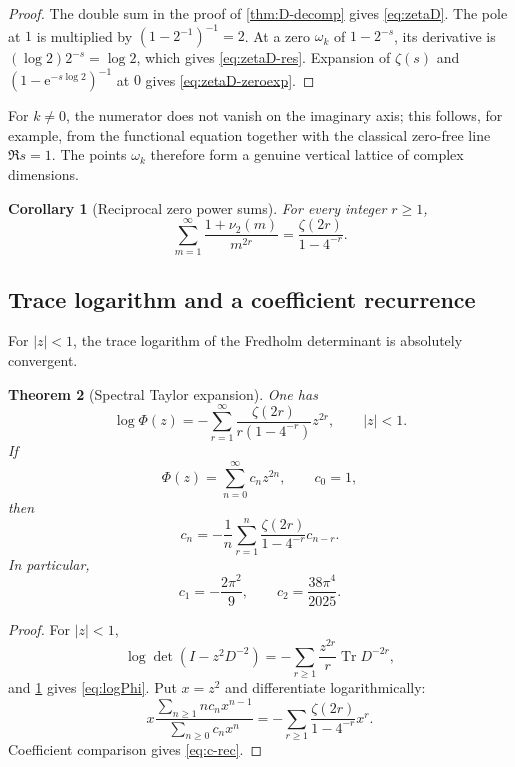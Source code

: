 \documentclass[11pt,oneside]{article}
\numberwithin{equation}{section}
\theoremstyle{plain}
\newtheorem{theorem}{Theorem}[section]
\newtheorem{corollary}[theorem]{Corollary}
\theoremstyle{definition}
\theoremstyle{remark}
\newcommand{\Tr}{\operatorname{Tr}}
\newcommand{\e}{\mathrm e}
\begin{document}
\begin{proof}
The double sum in the proof of \cref{thm:D-decomp} gives \cref{eq:zetaD}.  The pole at $1$ is multiplied by $(1-2^{-1})^{-1}=2$.  At a zero $\omega_k$ of $1-2^{-s}$, its derivative is $(\log2)2^{-s}=\log2$, which gives \cref{eq:zetaD-res}.  Expansion of $\zeta(s)$ and $(1-\e^{-s\log2})^{-1}$ at $0$ gives \cref{eq:zetaD-zeroexp}.
\end{proof}

For $k\ne0$, the numerator does not vanish on the imaginary axis; this follows, for example, from the functional equation together with the classical zero-free line $\Re s=1$.  The points $\omega_k$ therefore form a genuine vertical lattice of complex dimensions.

\begin{corollary}[Reciprocal zero power sums]\label{cor:zero-powers}
For every integer $r\ge1$,
\begin{equation}\label{eq:zero-powers}
 \sum_{m=1}^{\infty}\frac{1+\nu_2(m)}{m^{2r}}
 =\frac{\zeta(2r)}{1-4^{-r}}.
\end{equation}
\end{corollary}

\subsection{Trace logarithm and a coefficient recurrence}

For $|z|<1$, the trace logarithm of the Fredholm determinant is absolutely convergent.

\begin{theorem}[Spectral Taylor expansion]\label{thm:taylor}
One has
\begin{equation}\label{eq:logPhi}
 \boxed{\ \log\Phi(z)
 =-\sum_{r=1}^{\infty}
 \frac{\zeta(2r)}{r(1-4^{-r})}z^{2r},
 \qquad |z|<1.\ }
\end{equation}
If
\[
 \Phi(z)=\sum_{n=0}^{\infty}c_nz^{2n},\qquad c_0=1,
\]
then
\begin{equation}\label{eq:c-rec}
 \boxed{\ c_n=-\frac1n\sum_{r=1}^{n}
 \frac{\zeta(2r)}{1-4^{-r}}c_{n-r}.\ }
\end{equation}
In particular,
\begin{equation}\label{eq:first-c}
 c_1=-\frac{2\pi^2}{9},
 \qquad
 c_2=\frac{38\pi^4}{2025}.
\end{equation}
\end{theorem}

\begin{proof}
For $|z|<1$,
\[
 \log\det(I-z^2D^{-2})
 =-\sum_{r\ge1}\frac{z^{2r}}r\Tr D^{-2r},
\]
and \cref{cor:zero-powers} gives \cref{eq:logPhi}.  Put $x=z^2$ and differentiate logarithmically:
\[
 x\frac{\sum_{n\ge1}nc_nx^{n-1}}{\sum_{n\ge0}c_nx^n}
 =-\sum_{r\ge1}\frac{\zeta(2r)}{1-4^{-r}}x^r.
\]
Coefficient comparison gives \cref{eq:c-rec}.
\end{proof}
\end{document}
